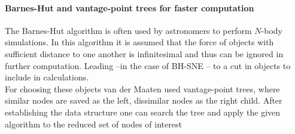 \documentclass[twocolumn]{bmcart}%
\begin{document}
\paragraph*{Barnes-Hut and vantage-point trees for faster computation}
The Barnes-Hut algorithm is often used by astronomers to perform $N$-body simulations\cite{DBLP:journals/corr/abs-1301-3342}. In this algorithm it is assumed that the force of objects with sufficient distance to one another is infinitesimal and thus can be ignored in further computation. Leading --in the case of BH-SNE -- to a cut in objects to include in calculations.\\
For choosing these objects van der Maaten used vantage-point trees, where similar nodes are saved as the left, dissimilar nodes as the right child. After establishing the data structure one can search the tree and apply the given algorithm to the reduced set of nodes of interest\\
\end{document}
